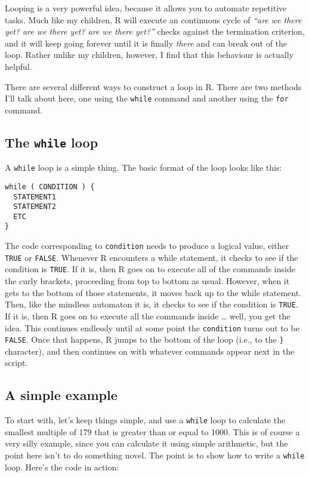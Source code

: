 \documentclass[]{book}
\begin{document}
Looping is a very powerful idea, because it allows you to automate repetitive tasks. Much like my children, R will execute an continuous cycle of \emph{``are we there yet? are we there yet? are we there yet?''} checks against the termination criterion, and it will keep going forever until it is finally \emph{there} and can break out of the loop. Rather unlike my children, however, I find that this behaviour is actually helpful.

There are several different ways to construct a loop in R. There are two methods I'll talk about here, one using the \texttt{while} command and another using the \texttt{for} command.

\hypertarget{the-while-loop}{%
\subsection{\texorpdfstring{The \texttt{while} loop}{The while loop}}\label{the-while-loop}}

A \texttt{while} loop is a simple thing. The basic format of the loop looks like this:

\begin{verbatim}
while ( CONDITION ) {
  STATEMENT1
  STATEMENT2
  ETC 
}
\end{verbatim}

The code corresponding to \texttt{condition} needs to produce a logical value, either \texttt{TRUE} or \texttt{FALSE}. Whenever R encounters a while statement, it checks to see if the condition is \texttt{TRUE}. If it is, then R goes on to execute all of the commands inside the curly brackets, proceeding from top to bottom as usual. However, when it gets to the bottom of those statements, it moves back up to the while statement. Then, like the mindless automaton it is, it checks to see if the condition is \texttt{TRUE}. If it is, then R goes on to execute all the commands inside \ldots{} well, you get the idea. This continues endlessly until at some point the \texttt{condition} turns out to be \texttt{FALSE}. Once that happens, R jumps to the bottom of the loop (i.e., to the \texttt{\}} character), and then continues on with whatever commands appear next in the script.

\hypertarget{a-simple-example}{%
\subsection{A simple example}\label{a-simple-example}}

To start with, let's keep things simple, and use a \texttt{while} loop to calculate the smallest multiple of 179 that is greater than or equal to 1000. This is of course a very silly example, since you can calculate it using simple arithmetic, but the point here isn't to do something novel. The point is to show how to write a \texttt{while} loop. Here's the code in action:
\end{document}
